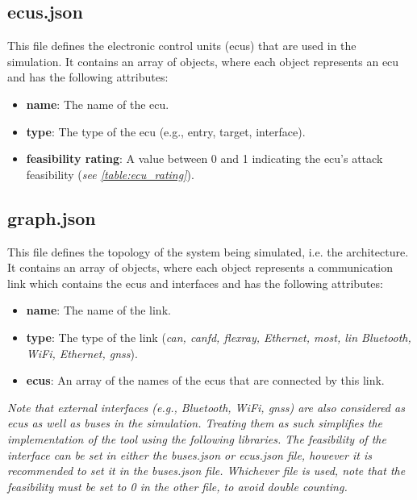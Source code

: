 \subsection{ecus.json}
\label{sec:ecus}

This file defines the electronic control units (\acrshort{ecu}s) that are used in the simulation.
It contains an array of objects, where each object represents an \acrshort{ecu} and has the following attributes:

\begin{itemize}
\item \textbf{name}: The name of the \acrshort{ecu}.
\item \textbf{type}: The type of the \acrshort{ecu} (e.g., entry, target, interface).
\item \textbf{feasibility rating}: A value between 0 and 1 indicating the \acrshort{ecu}'s attack feasibility (\textit{see \ref{table:ecu_rating}}).
\end{itemize}

\subsection{graph.json}
\label{sec:graph}

This file defines the topology of the system being simulated, i.e. the architecture. 
It contains an array of objects, where each object represents a communication link which contains the \acrshort{ecu}s and interfaces and has the following attributes:

\begin{itemize}
\item \textbf{name}: The name of the link.
\item \textbf{type}: The type of the link (\textit{\acrshort{can}, \acrshort{canfd}, \acrshort{flexray}, Ethernet, \acrshort{most}, \acrshort{lin} Bluetooth, WiFi, Ethernet, \acrshort{gnss}}).
\item \textbf{\acrshort{ecu}s}: An array of the names of the \acrshort{ecu}s that are connected by this link.
\end{itemize}

\textit{Note that external interfaces (e.g., Bluetooth, WiFi, \acrshort{gnss}) are also considered as \acrshort{ecu}s as well as buses in the simulation.
Treating them as such simplifies the implementation of the tool using the following libraries.
The feasibility of the interface can be set in either the buses.json or ecus.json file, however it is recommended to set it in the buses.json file.
Whichever file is used, note that the feasibility must be set to 0 in the other file, to avoid double counting.}


